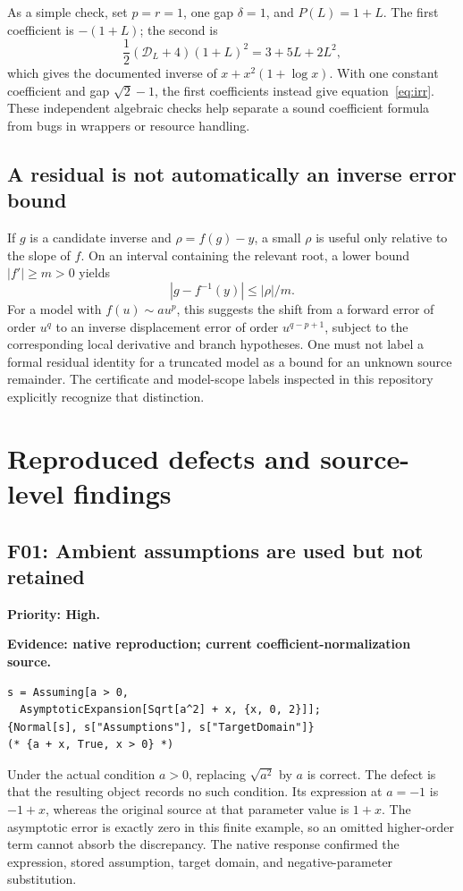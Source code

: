 \documentclass[11pt,a4paper]{article}
\newcommand{\D}{\mathcal D}
\newcommand{\finding}[3]{\Needspace{8\baselineskip}\subsection{#1: #2}\textbf{Priority: #3.}\par}
\begin{document}
As a simple check, set \(p=r=1\), one gap \(\delta=1\), and \(P(L)=1+L\). The first coefficient is \(-(1+L)\); the second is
\[
 \frac12(\D_L+4)(1+L)^2=3+5L+2L^2,
\]
which gives the documented inverse of \(x+x^2(1+\log x)\). With one constant coefficient and gap \(\sqrt2-1\), the first coefficients instead give equation~\eqref{eq:irr}. These independent algebraic checks help separate a sound coefficient formula from bugs in wrappers or resource handling.

\subsection{A residual is not automatically an inverse error bound}
If \(g\) is a candidate inverse and \(\rho=f(g)-y\), a small \(\rho\) is useful only relative to the slope of \(f\). On an interval containing the relevant root, a lower bound \(|f'|\ge m>0\) yields
\[
 |g-f^{-1}(y)|\le |\rho|/m.
\]
For a model with \(f(u)\sim a u^p\), this suggests the shift from a forward error of order \(u^q\) to an inverse displacement error of order \(u^{q-p+1}\), subject to the corresponding local derivative and branch hypotheses. One must not label a formal residual identity for a truncated model as a bound for an unknown source remainder. The certificate and model-scope labels inspected in this repository explicitly recognize that distinction.\cite{repo-main,repo-certificate}

\section{Reproduced defects and source-level findings}\label{sec:findings}

\finding{F01}{Ambient assumptions are used but not retained}{High}
\textbf{Evidence: native reproduction; current coefficient-normalization source.}

\begin{lstlisting}
s = Assuming[a > 0,
  AsymptoticExpansion[Sqrt[a^2] + x, {x, 0, 2}]];
{Normal[s], s["Assumptions"], s["TargetDomain"]}
(* {a + x, True, x > 0} *)
\end{lstlisting}
Under the actual condition \(a>0\), replacing \(\sqrt{a^2}\) by \(a\) is correct. The defect is that the resulting object records no such condition. Its expression at \(a=-1\) is \(-1+x\), whereas the original source at that parameter value is \(1+x\). The asymptotic error is exactly zero in this finite example, so an omitted higher-order term cannot absorb the discrepancy. The native response confirmed the expression, stored assumption, target domain, and negative-parameter substitution.
\end{document}

